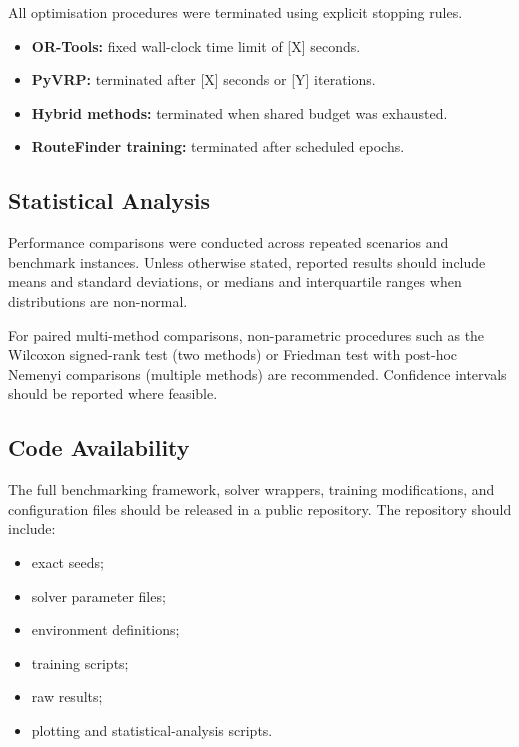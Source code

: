 All optimisation procedures were terminated using explicit stopping rules.

\begin{itemize}
    \item \textbf{OR-Tools:} fixed wall-clock time limit of [X] seconds.
    \item \textbf{PyVRP:} terminated after [X] seconds or [Y] iterations.
    \item \textbf{Hybrid methods:} terminated when shared budget was exhausted.
    \item \textbf{RouteFinder training:} terminated after scheduled epochs.
\end{itemize}

\subsection{Statistical Analysis}

Performance comparisons were conducted across repeated scenarios and benchmark
instances. Unless otherwise stated, reported results should include means and
standard deviations, or medians and interquartile ranges when distributions are
non-normal.

For paired multi-method comparisons, non-parametric procedures such as the
Wilcoxon signed-rank test (two methods) or Friedman test with post-hoc Nemenyi
comparisons (multiple methods) are recommended. Confidence intervals should be
reported where feasible.

\subsection{Code Availability}

The full benchmarking framework, solver wrappers, training modifications, and
configuration files should be released in a public repository. The repository
should include:

\begin{itemize}
    \item exact seeds;
    \item solver parameter files;
    \item environment definitions;
    \item training scripts;
    \item raw results;
    \item plotting and statistical-analysis scripts.
\end{itemize}
